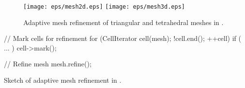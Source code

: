 \begin{figure}
  \begin{center}
    \texttt{[image: eps/mesh2d.eps]}
    \texttt{[image: eps/mesh3d.eps]}
    \caption{Adaptive mesh refinement of triangular and tetrahedral meshes in \dolfin{}.}
    \label{fig:refinedmeshes} 
  \end{center}
\end{figure}

\begin{table}
\begin{code}
  // Mark cells for refinement
  for (CellIterator cell(mesh); !cell.end(); ++cell)
    if ( ... )
      cell->mark();

  // Refine mesh
  mesh.refine();
\end{code}
\caption{Sketch of adaptive mesh refinement in \dolfin{}.}
\label{tab:refinement}
\end{table}
